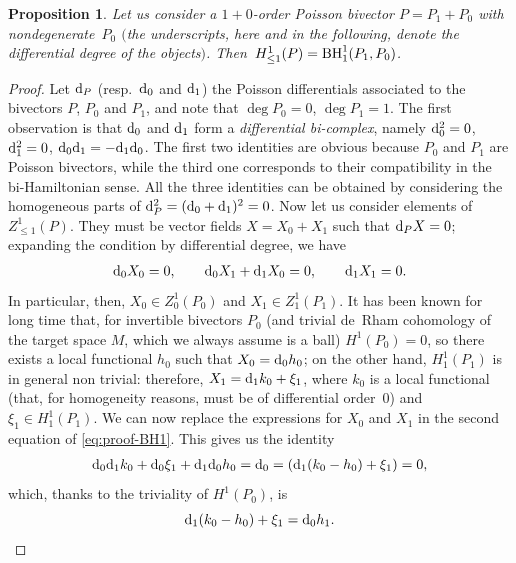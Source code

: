 \documentclass[10pt,a4paper]{amsart}
\numberwithin{equation}{section}
\newtheorem{Proposition}[Theorem]{Proposition}
 { \theoremstyle{definition}
\newtheorem{Definition}[Theorem]{Definition}
\newtheorem{Note}[Theorem]{Note}
\newtheorem{Example}[Theorem]{Example}
\newtheorem{Remark}[Theorem]{Remark} }
\begin{document}
\begin{Proposition}\label{prop:biham}
Let us consider a $1{+}0$-order Poisson bivector $P=P_1+P_0$ with nondegenerate~$P_0$ $($the underscripts, here and in the following, denote the \emph{differential degree} of the objects$)$. Then~${H^1_{\leq 1}(P)={\rm BH}^1_{1}(P_1,P_0)}$.
\end{Proposition}

\begin{proof}
Let ${\rm d}_P$ (resp.\ ${\rm d}_0$ and ${\rm d}_1$) the Poisson differentials associated to the bivectors $P$, $P_0$ and $P_1$, and note that $\deg P_0=0$, $\deg P_1=1$. The first observation is that ${\rm d}_0$ and ${\rm d}_1$ form a \emph{differential bi-complex}, namely ${\rm d}_0^2=0$, ${\rm d}_1^2=0$, ${\rm d}_0{\rm d}_1=-{\rm d}_1{\rm d}_0$. The first two identities are obvious because $P_0$ and $P_1$ are Poisson bivectors, while the third one corresponds to their compatibility in the bi-Hamiltonian sense. All the three identities can be obtained by considering the homogeneous parts of ${\rm d}_P^2=({\rm d}_0+{\rm d}_1)^2=0$. Now let us consider elements of $Z^1_{\leq 1}(P)$. They must be vector fields $X=X_0+X_1$ such that ${\rm d}_P X=0$; expanding the condition by differential degree, we have
\begin{gather}\label{eq:proof-BH1}
 {\rm d}_0 X_0=0,\qquad {\rm d}_0X_1+{\rm d}_1X_0=0,\qquad {\rm d}_1X_1=0.
\end{gather}
In particular, then, $X_0\in Z^1_0(P_0)$ and $X_1\in Z^1_1(P_1)$. It has been known for long time \cite{getzler} that, for invertible bivectors $P_0$ (and trivial de~Rham cohomology of the target space $M$, which we always assume is a ball) $H^1(P_0)=0$, so there exists a local functional $h_0$ such that $X_0={\rm d}_0h_0$; on the other hand, $H^1_1(P_1)$ is in general non trivial: therefore, $X_1={\rm d}_1 k_0 + \xi_1$, where $k_0$ is a local functional (that, for homogeneity reasons, must be of differential order~0) and $\xi_1\in H^1_1(P_1)$. We can now replace the expressions for $X_0$ and $X_1$ in the second equation of \eqref{eq:proof-BH1}. This gives us the identity
\begin{gather*}
{\rm d}_0{\rm d}_1k_0+{\rm d}_0\xi_1+{\rm d}_1{\rm d}_0h_0={\rm d}_0=({\rm d}_1(k_0-h_0)+\xi_1)=0,
\end{gather*}
which, thanks to the triviality of $H^1(P_0)$, is
\begin{equation}\label{eq:proof-BH2}
{\rm d}_1(k_0-h_0)+\xi_1={\rm d}_0 h_1.
\end{equation}

\end{proof}
\end{document}
